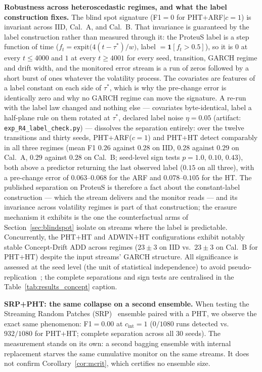 \documentclass[smallextended]{svjour3}
\begin{document}
\textbf{Robustness across heteroscedastic regimes, and what the label construction fixes.}
The blind spot signature (F1${=}0$ for PHT$+$ARF$|c{=}1$) is invariant across IID, Cal.~A, and Cal.~B. That invariance is guaranteed by the label construction rather than measured through it: the ProteuS label is a step function of time ($f_t = \mathrm{expit}\bigl(4(t-\tau^*)/w\bigr)$, label $= \mathbf{1}[f_t > 0.5]$), so it is $0$ at every $t \le 4000$ and $1$ at every $t \ge 4001$ for every seed, transition, GARCH regime and drift width, and the monitored error stream is a run of zeros followed by a short burst of ones whatever the volatility process. The covariates are features of a label constant on each side of $\tau^*$, which is why the pre-change error is identically zero and why no GARCH regime can move the signature. A re-run with the label law changed and nothing else --- covariates byte-identical, label a half-plane rule on them rotated at $\tau^*$, declared label noise $\eta = 0.05$ (artifact: \texttt{exp\_R4\_label\_check.py}) --- dissolves the separation entirely: over the twelve transitions and thirty seeds, PHT$+$ARF($c{=}1$) and PHT$+$HT detect comparably in all three regimes (mean F1 $0.26$ against $0.28$ on IID, $0.28$ against $0.29$ on Cal.~A, $0.29$ against $0.28$ on Cal.~B; seed-level sign tests $p = 1.0$, $0.10$, $0.43$), both above a predictor returning the last observed label ($0.15$ on all three), with a pre-change error of $0.063$--$0.068$ for the ARF and $0.078$--$0.105$ for the HT. The published separation on ProteuS is therefore a fact about the constant-label construction --- which the stream delivers and the monitor reads --- and its invariance across volatility regimes is part of that construction; the erasure mechanism it exhibits is the one the counterfactual arms of Section~\ref{sec:blindspot} isolate on streams where the label is predictable.
Concurrently, the PHT$+$HT and ADWIN$+$HT configurations exhibit notably stable Concept-Drift ADD across regimes ($23 \pm 3$ on IID vs.\ $23 \pm 3$ on Cal.~B for PHT$+$HT) despite the input streams' GARCH structure.
All significance is assessed at the seed level (the unit of statistical independence) to avoid pseudo-replication~\cite{demsar_statistical_2006}; the complete separations and sign tests are centralised in the Table~\ref{tab:results_concept} caption.

\textbf{SRP+PHT: the same collapse on a second ensemble.}
When testing the Streaming Random Patches (SRP)~\cite{gomes_srp_2019} ensemble paired with a PHT, we observe the exact same phenomenon: F1${=}0.00$ at $c_{\mathrm{int}}=1$ ($0/1080$ runs detected vs.\ $932/1080$ for PHT$+$HT; complete separation across all 30 seeds). The measurement stands on its own: a second bagging ensemble with internal replacement starves the same cumulative monitor on the same streams. It does not confirm Corollary~\ref{cor:mcrit}, which certifies no ensemble size.
\end{document}
